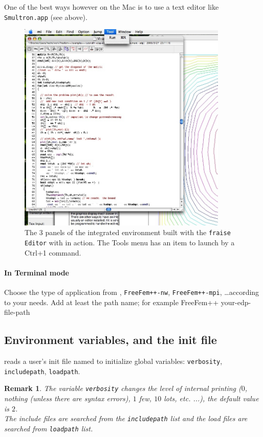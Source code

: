 \documentclass[a4paper,twoside,12pt]{book}
\newtheorem{remark}{Remark}
\begin{document}
One of the best ways however on the Mac is to use a text editor like \texttt{Smultron.app}
(see above).
\begin{figure}[htbp] %
   \centering
   \includegraphics[width=10cm]{mi.jpg}
   \caption{The 3 panels of the integrated environment built with the
\texttt{fraise Editor} with \freefempp in action. The Tools menu
has an item to launch \freefempp by a Ctrl+1 command.}
\end{figure}

\paragraph{In Terminal mode}

Choose the type of application from \freefempp, \texttt{FreeFem++-nw},  \texttt{FreeFem++-mpi}, \dots  according to your needs.  Add at least the path name; for example
\bFF
 FreeFem++ your-edp-file-path
\eFF

\subsection{Environment variables, and the init file}


 \freefempp reads a user's init file named 
 to initialize global variables:
   \texttt{verbosity}, \texttt{includepath}, \texttt{loadpath}.

\begin{remark} The variable \texttt{verbosity} changes the level of internal printing ($0$, nothing (unless there are syntax errors), $1$ few,  $10$  lots, etc. ...),
the default value is $2$.
\\
The include files are searched from the \texttt{includepath} list and the load files
are searched from  \texttt{loadpath} list.
\end{remark}
\end{document}
